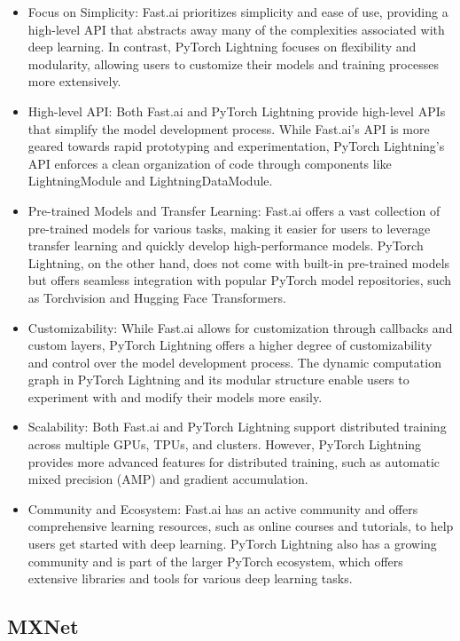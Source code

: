 \documentclass[12pt]{article}
\begin{document}
\begin{itemize}
    \item Focus on Simplicity: Fast.ai prioritizes simplicity and ease of use, providing a high-level API that abstracts away many of the complexities associated with deep learning. In contrast, PyTorch Lightning focuses on flexibility and modularity, allowing users to customize their models and training processes more extensively.
    \item High-level API: Both Fast.ai and PyTorch Lightning provide high-level APIs that simplify the model development process. While Fast.ai's API is more geared towards rapid prototyping and experimentation, PyTorch Lightning's API enforces a clean organization of code through components like LightningModule and LightningDataModule.
    \item Pre-trained Models and Transfer Learning: Fast.ai offers a vast collection of pre-trained models for various tasks, making it easier for users to leverage transfer learning and quickly develop high-performance models. PyTorch Lightning, on the other hand, does not come with built-in pre-trained models but offers seamless integration with popular PyTorch model repositories, such as Torchvision and Hugging Face Transformers.
    \item Customizability: While Fast.ai allows for customization through callbacks and custom layers, PyTorch Lightning offers a higher degree of customizability and control over the model development process. The dynamic computation graph in PyTorch Lightning and its modular structure enable users to experiment with and modify their models more easily.
    \item Scalability: Both Fast.ai and PyTorch Lightning support distributed training across multiple GPUs, TPUs, and clusters. However, PyTorch Lightning provides more advanced features for distributed training, such as automatic mixed precision (AMP) and gradient accumulation.
    \item Community and Ecosystem: Fast.ai has an active community and offers comprehensive learning resources, such as online courses and tutorials, to help users get started with deep learning. PyTorch Lightning also has a growing community and is part of the larger PyTorch ecosystem, which offers extensive libraries and tools for various deep learning tasks.
\end{itemize}

\subsection{MXNet}
\end{document}
